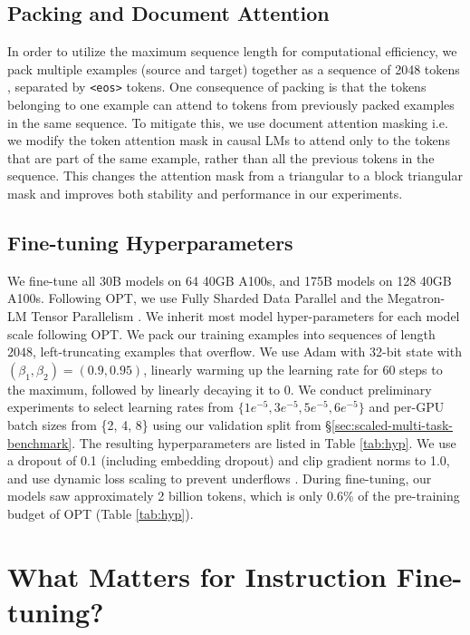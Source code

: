 \subsection{Packing and Document Attention}
\label{subsec:packing}
In order to utilize the maximum sequence length for computational efficiency, we pack multiple examples (source and target) together as a sequence of 2048 tokens \citep{raffel2020t5}, separated by \texttt{<eos>} tokens. One consequence of packing is that the tokens belonging to one example can attend to tokens from previously packed examples in the same sequence. To mitigate this, we use document attention masking i.e. we modify the token attention mask in causal LMs to attend only to the tokens that are part of the same example, rather than all the previous tokens in the sequence. This changes the attention mask from a triangular to a block triangular mask and improves both stability and performance in our experiments. 

\subsection{Fine-tuning Hyperparameters}
\label{subsec:fthp}

We fine-tune all 30B models on 64 40GB A100s, and 175B models on 128 40GB A100s. Following OPT, we use Fully Sharded Data Parallel \citep{artetxe2021efficient} and the Megatron-LM Tensor Parallelism \citep{shoeybi2019megatron}. We inherit most model hyper-parameters for each model scale following OPT. We pack our training examples into sequences of length $2048$, left-truncating examples that overflow. We use Adam \citep{kingma2014adam} with 32-bit state with $(\beta_1, \beta_2) = (0.9, 0.95)$, linearly warming up the learning rate for $60$ steps to the maximum, followed by linearly decaying it to 0. We conduct preliminary experiments to select learning rates from $\{1e^{-5}, 3e^{-5}, 5e^{-5}, 6e^{-5}\}$ and per-GPU batch sizes from \{2, 4, 8\} using our validation split from \S\ref{sec:scaled-multi-task-benchmark}. The resulting hyperparameters are listed in Table \ref{tab:hyp}. We use a dropout of 0.1 (including embedding dropout) and clip gradient norms to 1.0, and use dynamic loss scaling to prevent underflows \citep{micikevicius2018mixed}. During fine-tuning, our models saw approximately 2 billion tokens, which is only 0.6\% of the pre-training budget of OPT (Table \ref{tab:hyp}).

\section{What Matters for Instruction Fine-tuning?}
\label{sec:ablation}

